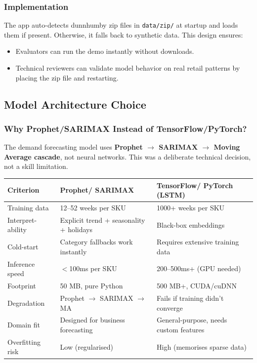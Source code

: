 \documentclass[11pt, a4paper]{article}
\begin{document}
\subsubsection{Implementation}

The app auto-detects dunnhumby zip files in \texttt{data/zip/} at startup and loads them if present. Otherwise, it falls back to synthetic data. This design ensures:
\begin{itemize}[leftmargin=1.5em]
    \item Evaluators can run the demo instantly without downloads.
    \item Technical reviewers can validate model behavior on real retail patterns by placing the zip file and restarting.
\end{itemize}

\vspace{1em}

\subsection{Model Architecture Choice}\label{sec:model-choice}

\subsubsection{Why Prophet/SARIMAX Instead of TensorFlow/PyTorch?}

The demand forecasting model uses \textbf{Prophet $\rightarrow$ SARIMAX $\rightarrow$ Moving Average cascade}, not neural networks. This was a deliberate technical decision, not a skill limitation.

\begin{tabularx}{\textwidth}{| p{3.5cm} | p{3.5cm} | X |}
    \hline
    \textbf{Criterion} & \textbf{Prophet/ SARIMAX} & \textbf{TensorFlow/ PyTorch (LSTM)} \\
    \hline\hline
    Training data & 12--52 weeks per SKU & 1000+ weeks per SKU \\
    \hline
    Interpret- ability & Explicit trend + seasonality + holidays & Black-box embeddings \\
    \hline
    Cold-start & Category fallbacks work instantly & Requires extensive training data \\
    \hline
    Inference speed & $<$100ms per SKU & 200--500ms+ (GPU needed) \\
    \hline
    Footprint & 50 MB, pure Python & 500 MB+, CUDA/cuDNN \\
    \hline
    Degradation & Prophet $\rightarrow$ SARIMAX $\rightarrow$ MA & Fails if training didn't converge \\
    \hline
    Domain fit & Designed for business forecasting & General-purpose, needs custom features \\
    \hline
    Overfitting risk & Low (regularised) & High (memorises sparse data) \\
    \hline
\end{tabularx}
\end{document}

